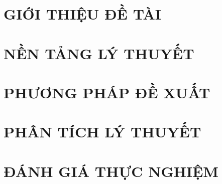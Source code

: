 \documentclass[a4paper,13pt,3p,twoside]{report}
\theoremstyle{definition}
\begin{document}
\renewcommand{\listtablename}{DANH MỤC BẢNG BIỂU}
{\let\oldnumberline\numberline
\renewcommand{\numberline}{Bảng~\oldnumberline}
\listoftables}

\glsaddall 
\renewcommand*{\acronymname}{DANH MỤC THUẬT NGỮ VÀ TỪ VIẾT TẮT}
\renewcommand*{\entryname}{Thuật ngữ}
\renewcommand*{\descriptionname}{Ý nghĩa}
\printnoidxglossaries

\renewcommand\appendixname{PHỤ LỤC}
\renewcommand\appendixpagename{PHỤ LỤC}
\renewcommand\appendixtocname{PHỤ LỤC}





\newpage
{}

\pagestyle{fancy}
\fancyhf{}
\fancyhead[RE, LO]{\leftmark}
\fancyfoot[RE, LO]{\thepage}

\chapter{GIỚI THIỆU ĐỀ TÀI}

\newpage
\chapter{NỀN TẢNG LÝ THUYẾT}



\newpage
\chapter{PHƯƠNG PHÁP ĐỀ XUẤT}


\newpage
\chapter{PHÂN TÍCH LÝ THUYẾT}


\newpage
\chapter{ĐÁNH GIÁ THỰC NGHIỆM}

\end{document}
